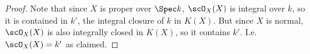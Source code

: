 \begin{proof}
	Note that since $X$ is proper over $\Spec k$, $\scO_X(X)$ is integral over $k$, so it is contained in $k'$, the integral closure of $k$ in $K(X)$. But since $X$ is normal, $\scO_X(X)$ is also integrally closed in $K(X)$, so it contains $k'$. I.e. $\scO_X(X) = k'$ as claimed.
\end{proof}
